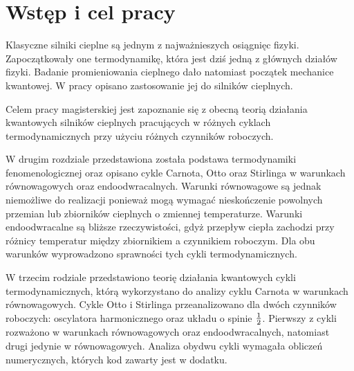 \chapter{Wstęp i cel pracy}

Klasyczne silniki cieplne są jednym z najważnieszych osiągnięc fizyki. Zapoczątkowały one termodynamikę, która jest dziś jedną z głównych działów fizyki. Badanie promieniowania cieplnego dało natomiast początek mechanice kwantowej. W pracy opisano zastosowanie jej do silników cieplnych.

Celem pracy magisterskiej jest zapoznanie się z obecną teorią działania kwantowych silników cieplnych pracujących w różnych cyklach termodynamicznych przy użyciu różnych czynników roboczych.

W drugim rozdziale przedstawiona została podstawa termodynamiki fenomenologicznej oraz opisano cykle Carnota, Otto oraz Stirlinga w warunkach równowagowych oraz endoodwracalnych. Warunki równowagowe są jednak niemożliwe do realizacji ponieważ mogą wymagać nieskończenie powolnych przemian lub zbiorników cieplnych o zmiennej temperaturze. Warunki endoodwracalne są bliższe rzeczywistości, gdyż przepływ ciepła zachodzi przy różnicy temperatur między zbiornikiem a czynnikiem roboczym. Dla obu warunków wyprowadzono sprawności tych cykli termodynamicznych.

W trzecim rodziale przedstawiono teorię działania kwantowych cykli termodynamicznych, którą wykorzystano do analizy cyklu Carnota w warunkach równowagowych. Cykle Otto i Stirlinga przeanalizowano dla dwóch czynników roboczych: oscylatora harmonicznego oraz układu o spinie \(\frac{1}{2}\). Pierwszy z cykli rozważono w warunkach równowagowych oraz endoodwracalnych, natomiast drugi jedynie w równowagowych. Analiza obydwu cykli wymagała obliczeń numerycznych, których kod zawarty jest w dodatku.
